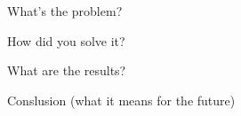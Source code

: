 What's the problem?

How did you solve it?

What are the results?

Conslusion (what it means for the future)